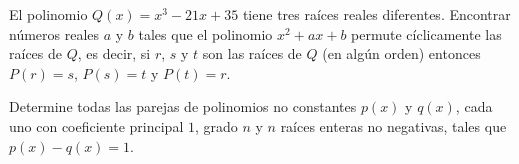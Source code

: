 \documentclass[11pt]{scrartcl}
\newcommand{\thmdifficulty}{0}
\newcommand{\problemdiff}[1]{\renewcommand{\thmdifficulty}{#1}}
\begin{document}
\problemdiff{4}
\begin{problema} [OMCC 2016/3]
    El polinomio $Q(x)=x^3-21x+35$ tiene tres raíces reales diferentes. Encontrar números reales $a$ y $b$ tales que el polinomio $x^2+ax+b$ permute cíclicamente las raíces de $Q$, es decir, si $r$, $s$ y $t$ son las raíces de $Q$ (en algún orden) entonces $P(r)=s$, $P(s)=t$ y $P(t)=r$.
\end{problema}

\problemdiff{5}
\begin{problema} [OMCC 2013/6]
    
    Determine todas las parejas de polinomios no constantes $p(x)$ y $q(x)$, cada uno con coeficiente principal $1$, grado $n$ y $n$ raíces enteras no negativas, tales que $p(x)-q(x)=1$. 

    
\end{problema}
\end{document}
